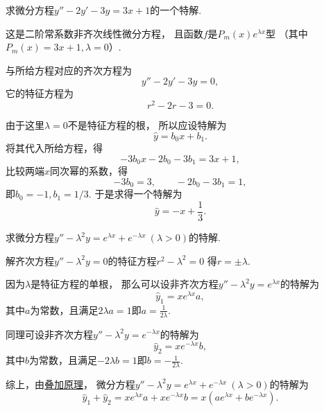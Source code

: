\begin{example}
求微分方程\(y''-2y'-3y=3x+1\)的一个特解.
\begin{solution}
这是二阶常系数非齐次线性微分方程，
且函数\(f\)是\(P_m(x) e^{\lambda x}\)型
（其中\(P_m(x) = 3x+1, \lambda=0\)）.

与所给方程对应的齐次方程为\begin{equation*}
	y''-2y'-3y=0,
\end{equation*}
它的特征方程为\begin{equation*}
	r^2-2r-3=0.
\end{equation*}

由于这里\(\lambda=0\)不是特征方程的根，
所以应设特解为\begin{equation*}
	\hat{y} = b_0 x + b_1.
\end{equation*}
将其代入所给方程，得\begin{equation*}
	-3 b_0 x - 2 b_0 - 3 b_1 = 3x+1,
\end{equation*}
比较两端\(x\)同次幂的系数，得\begin{equation*}
	-3 b_0 = 3, \qquad -2 b_0 - 3 b_1 = 1,
\end{equation*}
即\(b_0=-1, b_1=1/3\).
于是求得一个特解为\begin{equation*}
	\hat{y} = -x + \frac{1}{3}.
\end{equation*}
\end{solution}
\end{example}

\begin{example}
求微分方程\(y'' - \lambda^2 y = e^{\lambda x} + e^{-\lambda x}\ (\lambda>0)\)的特解.
\begin{solution}
解齐次方程\(y'' - \lambda^2 y = 0\)的特征方程\(r^2 - \lambda^2 = 0\)
得\(r = \pm\lambda\).

因为\(\lambda\)是特征方程的单根，
那么可以设非齐次方程\(y'' - \lambda^2 y = e^{\lambda x}\)的特解为\begin{equation*}
	\hat{y}_1 = x e^{\lambda x} a,
\end{equation*}
其中\(a\)为常数，且满足\(2\lambda a = 1\)即\(a = \frac{1}{2\lambda}\).

同理可设非齐次方程\(y'' - \lambda^2 y = e^{-\lambda x}\)的特解为\begin{equation*}
	\hat{y}_2 = x e^{-\lambda x} b,
\end{equation*}
其中\(b\)为常数，且满足\(-2\lambda b = 1\)即\(b = -\frac{1}{2\lambda}\).

综上，由\hyperref[theorem:微分方程.二阶非齐次线性微分方程的解的叠加原理]{叠加原理}，
微分方程\(y'' - \lambda^2 y = e^{\lambda x} + e^{-\lambda x}\ (\lambda>0)\)的特解为\begin{equation*}
	\hat{y}_1 + \hat{y}_2 = x e^{\lambda x} a + x e^{-\lambda x} b
	= x(a e^{\lambda x} + b e^{-\lambda x}).
\end{equation*}
\end{solution}
\end{example}

